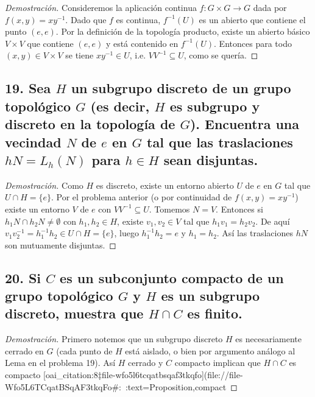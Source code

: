\documentclass{article}
\begin{document}
\begin{proof}[Demostración]
Consideremos la aplicación continua $f:G\times G\to G$ dada por $f(x,y)=xy^{-1}$. Dado que $f$ es continua, $f^{-1}(U)$ es un abierto que contiene el punto $(e,e)$. Por la definición de la topología producto, existe un abierto básico $V\times V$ que contiene $(e,e)$ y está contenido en $f^{-1}(U)$. Entonces para todo $(x,y)\in V\times V$ se tiene $xy^{-1}\in U$, i.e. $VV^{-1}\subseteq U$, como se quería.
\end{proof}

\subsection*{19. Sea $H$ un subgrupo discreto de un grupo topológico $G$ (es decir, $H$ es subgrupo y discreto en la topología de $G$). Encuentra una vecindad $N$ de $e$ en $G$ tal que las traslaciones $hN=L_h(N)$ para $h\in H$ sean disjuntas.}

\begin{proof}[Demostración]
Como $H$ es discreto, existe un entorno abierto $U$ de $e$ en $G$ tal que $U\cap H=\{e\}$. Por el problema anterior (o por continuidad de $f(x,y)=xy^{-1}$) existe un entorno $V$ de $e$ con $VV^{-1}\subseteq U$. Tomemos $N=V$. Entonces si $h_1N\cap h_2N\neq\emptyset$ con $h_1,h_2\in H$, existe $v_1,v_2\in V$ tal que $h_1v_1=h_2v_2$. De aquí $v_1v_2^{-1}=h_1^{-1}h_2\in U\cap H=\{e\}$, luego $h_1^{-1}h_2=e$ y $h_1=h_2$. Así las traslaciones $hN$ son mutuamente disjuntas. 
\end{proof}

\subsection*{20. Si $C$ es un subconjunto compacto de un grupo topológico $G$ y $H$ es un subgrupo discreto, muestra que $H\cap C$ es finito.}

\begin{proof}[Demostración]
Primero notemos que un subgrupo discreto $H$ es necesariamente cerrado en $G$ (cada punto de $H$ está aislado, o bien por argumento análogo al Lema en el problema 19). Así $H$ cerrado y $C$ compacto implican que $H\cap C$ es compacto [oai_citation:8‡file-wfo5l6tcqatbsqaf3tkqfo](file://file-Wfo5L6TCqatBSqAF3tkqFo#:~:text=Proposition,compact%
\end{proof}
\end{document}
